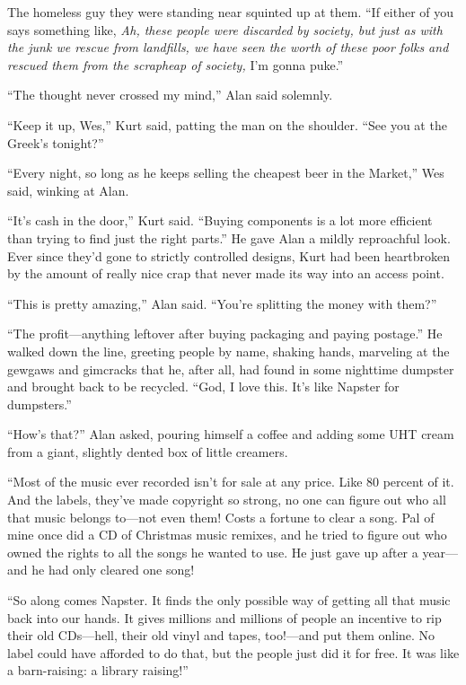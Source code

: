 \documentclass{article}
\begin{document}
The homeless guy they were standing near squinted up at them.  ``If
either of you says something like, \textit{Ah, these people were
discarded by society, but just as with the junk we rescue from
landfills, we have seen the worth of these poor folks and rescued them
from the scrapheap of society,} I'm gonna puke.''

``The thought never crossed my mind,'' Alan said solemnly.

``Keep it up, Wes,'' Kurt said, patting the man on the shoulder. 
``See you at the Greek's tonight?''

``Every night, so long as he keeps selling the cheapest beer in the
Market,'' Wes said, winking at Alan.

``It's cash in the door,'' Kurt said.  ``Buying components is a lot
more efficient than trying to find just the right parts.'' He gave
Alan a mildly reproachful look.  Ever since they'd gone to strictly
controlled designs, Kurt had been heartbroken by the amount of really
nice crap that never made its way into an access point.

``This is pretty amazing,'' Alan said.  ``You're splitting the money
with them?''

``The profit---anything leftover after buying packaging and paying
postage.'' He walked down the line, greeting people by name, shaking
hands, marveling at the gewgaws and gimcracks that he, after all, had
found in some nighttime dumpster and brought back to be recycled. 
``God, I love this.  It's like Napster for dumpsters.''

``How's that?'' Alan asked, pouring himself a coffee and adding some
UHT cream from a giant, slightly dented box of little creamers.

``Most of the music ever recorded isn't for sale at any price.  Like
80 percent of it.  And the labels, they've made copyright so strong,
no one can figure out who all that music belongs to---not even them! 
Costs a fortune to clear a song.  Pal of mine once did a CD of
Christmas music remixes, and he tried to figure out who owned the
rights to all the songs he wanted to use.  He just gave up after a
year---and he had only cleared one song!

``So along comes Napster.  It finds the only possible way of getting
all that music back into our hands.  It gives millions and millions of
people an incentive to rip their old CDs---hell, their old vinyl and
tapes, too!---and put them online.  No label could have afforded to do
that, but the people just did it for free.  It was like a
barn-raising:  a library raising!''
\end{document}
